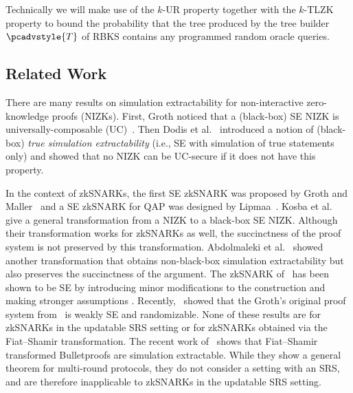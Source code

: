 \documentclass[10pt]{llncs}
\newcommand{\tdv}{\pcadvstyle{T}}
\begin{document}



Technically we will make use of the $k$-UR property together with the $k$-TLZK property to bound the probability that the tree produced by the tree builder $\tdv$ of RBKS contains any programmed random oracle queries.

\subsection{Related Work}
There are many results on simulation extractability for
non-interactive zero-knowledge proofs (NIZKs). First, Groth \cite{AC:Groth07}
noticed that a (black-box) SE NIZK is
universally-composable (UC)~\cite{EPRINT:Canetti00}. Then Dodis et al.~\cite{AC:DHLW10} introduced a
notion of (black-box) \emph{true simulation extractability} (i.e., SE with simulation of true statements only) and showed that no
NIZK can be UC-secure if it does not have this property. 

In the context of zkSNARKs, the first
SE zkSNARK was proposed by Groth and Maller~\cite{C:GroMal17} and a SE
zkSNARK for QAP was designed by Lipmaa~\cite{EPRINT:Lipmaa19a}.
Kosba et
al.~\cite{EPRINT:KZMQCP15} give a general transformation from a NIZK to a
black-box SE NIZK. Although their transformation works for zkSNARKs as well,
the succinctness of the proof system is not preserved by this transformation.
Abdolmaleki et al.~\cite{CCS:AbdRamSla20} showed another transformation that
obtains non-black-box simulation extractability but also preserves
the succinctness of the argument. 
The zkSNARK of~\cite{EC:Groth16} has been shown to be SE by introducing minor modifications to the construction and making
stronger assumptions \cite{EPRINT:BowGab18,EPRINT:AtaBag19}. Recently,~\cite{EPRINT:BKSV20} showed that the
Groth's original proof system from~\cite{EC:Groth16} is weakly SE and
randomizable. None of these results are for zkSNARKs in the updatable SRS setting or for zkSNARKs obtained via the Fiat--Shamir transformation. The recent work of~\cite{cryptoeprint:GOPTT22} shows that Fiat--Shamir transformed Bulletproofs are simulation extractable. While they show a general theorem for multi-round protocols, they do not consider a setting with an SRS, and are therefore inapplicable to zkSNARKs in the updatable SRS setting.
\end{document}
